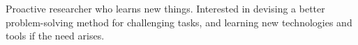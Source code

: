 

\begin{cvparagraph}

Proactive researcher who learns new things. Interested in devising a better problem-solving method for challenging tasks, and learning new technologies and tools if the need arises.
\end{cvparagraph}
